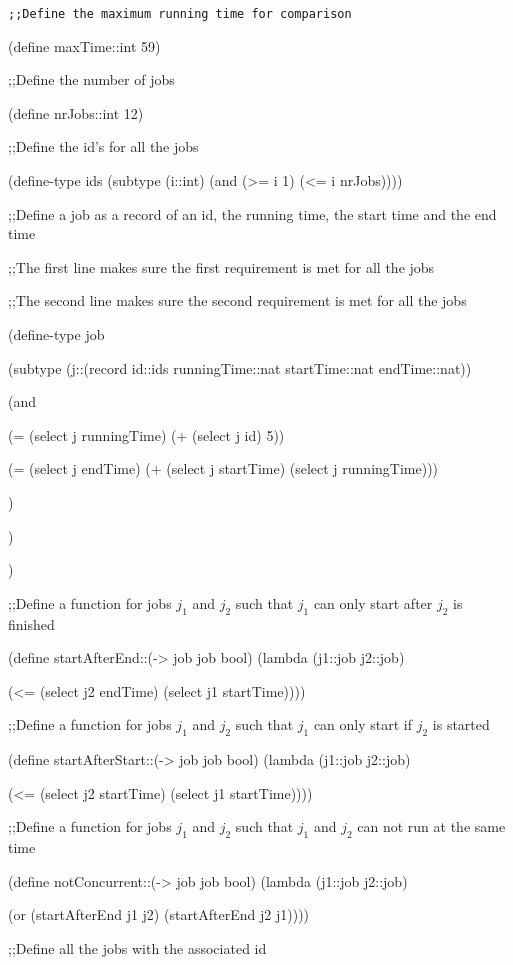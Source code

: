 \documentclass[12pt]{article}
\begin{document}
{\footnotesize

{\tt;;Define the maximum running time for comparison

(define maxTime::int 59)


;;Define the number of jobs

(define nrJobs::int 12)


;;Define the id's for all the jobs

(define-type ids (subtype (i::int) (and (>= i 1) (<= i nrJobs))))



;;Define a job as a record of an id, the running time, the start time and the end time

;;The first line makes sure the first requirement is met for all the jobs

;;The second line makes sure the second requirement is met for all the jobs

(define-type job 

	(subtype (j::(record id::ids runningTime::nat startTime::nat endTime::nat))

		(and 

			(= (select j runningTime) (+ (select j id) 5))

			(= (select j endTime) (+ (select j startTime) (select j runningTime)))

		)

	)

)


;;Define a function for jobs $j_1$ and $j_2$ such that $j_1$ can only start after $j_2$ is finished

(define startAfterEnd::(-> job job bool) (lambda (j1::job j2::job) 

(<= (select j2 endTime) (select j1 startTime))))


;;Define a function for jobs $j_1$ and $j_2$ such that $j_1$ can only start if $j_2$ is started

(define startAfterStart::(-> job job bool) (lambda (j1::job j2::job) 

(<= (select j2 startTime) (select j1 startTime))))


;;Define a function for jobs $j_1$ and $j_2$ such that $j_1$ and $j_2$ can not run at the same time

(define notConcurrent::(-> job job bool) (lambda (j1::job j2::job) 

(or (startAfterEnd j1 j2) (startAfterEnd j2 j1))))


;;Define all the jobs with the associated id

}}
\end{document}
